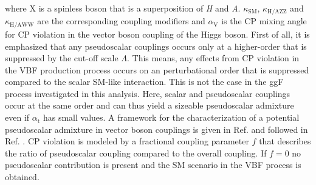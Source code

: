  where X is a spinless boson that is a superposition of \textit{H} and \textit{A}. $\kappa_\text{SM}$, $\kappa_\text{H/AZZ}$ and $\kappa_\text{H/AWW}$ are the corresponding coupling modifiers and $\alpha_\text{V}$ is the CP mixing angle for CP violation in the vector boson coupling of the Higgs boson.
First of all, it is emphasized that any pseudoscalar couplings occurs only at a higher-order that is suppressed by the cut-off scale $\Lambda$. This means, any effects from CP violation in the VBF production process
occurs on an perturbational order that is suppressed compared to the scalar SM-like interaction. This is not the case in the ggF process investigated in this analysis. Here, scalar and pseudoscalar couplings occur at the same order and can thus
yield a sizeable pseudoscalar admixture even if $\alpha_\text{t}$ has small values.
A framework for the characterization of a potential pseudoscalar admixture in vector boson couplings is given in Ref. \cite{gritsan1} and followed in Ref. \cite{CMS-AN-17-034}. 
CP violation is modeled by a fractional coupling parameter $f$ that describes the ratio of pseudoscalar coupling compared to the overall coupling. If $f=0$ no pseudoscalar 
contribution is present and the SM scenario in the VBF process is obtained.
